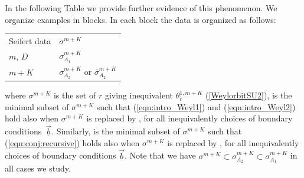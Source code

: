 \documentclass[10pt,a4paper]{amsart}
\def\bv{{\vec{\underline{b}}}}
\theoremstyle{definition}
\numberwithin{equation}{section}
\begin{document}
In the following Table we provide further evidence of this phenomenon. We organize examples in blocks. In each block the data is organized as follows:
\begin{table}[ht]\renewcommand{\arraystretch}{1.2}
 \centering
 \begin{tabular}{|ll|}\hline
 Seifert data & $\sigma^{m+K}$ \\
 $m$, $D$ & $\sigma_{A_{1}}^{m+K}$ \\
 $m+K$ & $\sigma_{A_{2}}^{m+K}$ or $\bar \sigma_{A_{2}}^{m+K}$\\\hline
 \end{tabular}
\end{table}
 where $\sigma^{m+K}$ is the set of $r$ giving
inequivalent $\theta^{1,m+K}_r$ (\ref{WeylorbitSU2}),  is the minimal subset of $\sigma^{m+K}$ such that
(\ref{eqn:intro_Weyl1}) and (\ref{eqn:intro_Weyl2}) hold also when $\sigma^{m+K}$ is replaced by , for all inequivalently choices of boundary conditions~$\bv$. Similarly,
  is the minimal subset of $\sigma^{m+K}$ such that
(\ref{eqn:conj:recursive}) holds also when $\sigma^{m+K}$ is replaced by , for all inequivalently choices of boundary conditions $\bv$. Note that we have $\sigma_{}^{m+K}\subset \sigma_{A_2}^{m+K}\subset \sigma_{A_1}^{m+K}$ in all cases we study.
\end{document}
